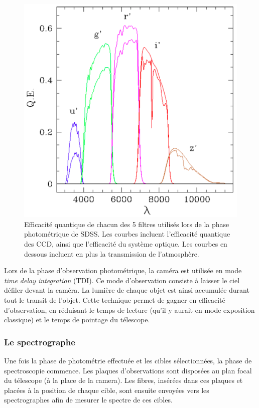 \documentclass[11pt, twoside, a4paper, openright]{report}
\begin{document}
\begin{figure}
  \centering
  \includegraphics[scale=0.4]{Filtres}
  \caption{Efficacité quantique de chacun des 5 filtres utilisés lors de la phase photométrique de SDSS. Les courbes incluent l'efficacité quantique des CCD, ainsi que l'efficacité du système optique. Les courbes en dessous incluent en plus la transmission de l'atmosphère.}
  \label{fig:Filtres}
\end{figure}

Lors de la phase d'observation photométrique, la caméra est utilisée en mode \emph{time delay integration} (TDI). Ce mode d'observation consiste à laisser le ciel défiler devant la caméra. La lumière de chaque objet est ainsi accumulée durant tout le transit de l'objet. Cette technique permet de gagner en efficacité d'observation, en réduisant le temps de lecture (qu'il y aurait en mode exposition classique) et le temps de pointage du télescope.


\subsubsection{Le spectrographe}
Une fois la phase de photométrie effectuée et les cibles sélectionnées, la phase de spectroscopie commence. Les plaques d'observations sont disposées au plan focal du télescope (à la place de la camera). Les fibres, insérées dans ces plaques et placées à la position de chaque cible, sont ensuite envoyées vers les spectrographes \autocite{Smee2012} afin de mesurer le spectre de ces cibles.
\end{document}
